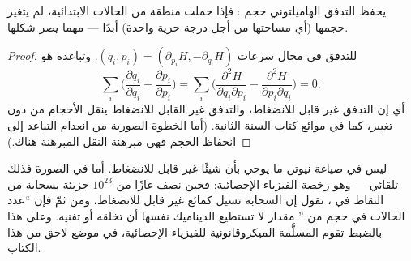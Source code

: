 \begin{theorem}\label{thm:b3:hamiltonian-mechanics:liouville}
يحفظ التدفق الهاميلتوني حجم : فإذا حملت  منطقة من الحالات الابتدائية، لم يتغير حجمها (أي
مساحتها من أجل درجة حرية واحدة) أبدًا --- مهما يصر شكلها.
\end{theorem}

\begin{proof}
للتدفق في  مجال سرعات $(\dot q_i, \dot p_i) =
(\partial_{p_i}H, -\partial_{q_i}H)$. وتباعده هو
\[
\sum_i\Big(\frac{\partial\dot q_i}{\partial q_i}
 + \frac{\partial\dot p_i}{\partial p_i}\Big)
 = \sum_i\Big(\frac{\partial^2H}{\partial q_i\partial p_i}
 - \frac{\partial^2H}{\partial p_i\partial q_i}\Big) = 0 :
\]
أي إن التدفق غير قابل للانضغاط، والتدفق غير القابل للانضغاط ينقل
الأحجام من دون تغيير، كما في موائع كتاب السنة الثانية. (أما
الخطوة الصورية من انعدام التباعد إلى انحفاظ الحجم فهي مبرهنة
النقل المبرهنة هناك.)
\end{proof}

\begin{remark}\label{rem:b3:hamiltonian-mechanics:liouville-matters}
ليس في صياغة نيوتن ما يوحي بأن شيئًا غير قابل للانضغاط. أما في
الصورة  فذلك تلقائي --- وهو رخصة الفيزياء الإحصائية:
فحين نصف غازًا من $10^{23}$ جزيئة بسحابة من النقاط في ، تقول  إن السحابة تسيل كمائع غير قابل
للانضغاط، ومن ثمّ فإن ``عدد الحالات في حجم من '' مقدار
لا تستطيع الديناميك نفسها أن تخلقه أو تفنيه. وعلى هذا بالضبط
تقوم المسلَّمة الميكروقانونية للفيزياء الإحصائية، في موضع لاحق
من هذا الكتاب.
\end{remark}

